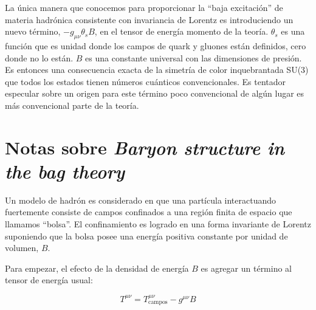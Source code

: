 La única manera que conocemos para proporcionar la ``baja excitación'' de materia hadrónica consistente con invariancia de Lorentz es introduciendo un nuevo término, $-{g}_{\mu \nu} {\theta}_{s} B$, en el tensor de energía momento de la teoría. ${\theta}_{s}$ es una función que es unidad donde los campos de quark y gluones están definidos, cero donde no lo están. ${B}$ es una constante universal con las dimensiones de presión. Es entonces una consecuencia exacta de la simetría de color inquebrantada SU(3) que todos los estados tienen números cuánticos convencionales. Es tentador especular sobre un origen para este término poco convencional de algún lugar es más convencional parte de la teoría.



\section{Notas sobre \emph{Baryon structure in the bag theory}}

Un modelo de hadrón es considerado en que una partícula interactuando fuertemente consiste de campos confinados a una región finita de espacio que llamamos ``bolsa''. El confinamiento es logrado en una forma invariante de Lorentz suponiendo que la bolsa posee una energía positiva constante por unidad de volumen, $B$.

Para empezar, el efecto de la densidad de energía $B$ es agregar un término al tensor de energía usual:

\begin{equation}
{T}^{\mu \nu} = {T}_{\mathrm{campos}}^{\mu \nu} - {g}^{\mu \nu} B
\end{equation}


